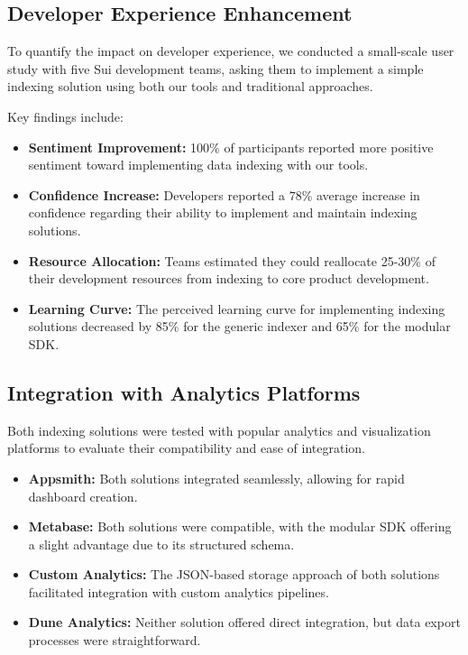 \subsection{Developer Experience Enhancement}

To quantify the impact on developer experience, we conducted a small-scale user study with five Sui development teams, asking them to implement a simple indexing solution using both our tools and traditional approaches.

Key findings include:

\begin{itemize}
    \item \textbf{Sentiment Improvement:} 100\% of participants reported more positive sentiment toward implementing data indexing with our tools.
    
    \item \textbf{Confidence Increase:} Developers reported a 78\% average increase in confidence regarding their ability to implement and maintain indexing solutions.
    
    \item \textbf{Resource Allocation:} Teams estimated they could reallocate 25-30\% of their development resources from indexing to core product development.
    
    \item \textbf{Learning Curve:} The perceived learning curve for implementing indexing solutions decreased by 85\% for the generic indexer and 65\% for the modular SDK.
\end{itemize}

\subsection{Integration with Analytics Platforms}

Both indexing solutions were tested with popular analytics and visualization platforms to evaluate their compatibility and ease of integration.

\begin{itemize}
    \item \textbf{Appsmith:} Both solutions integrated seamlessly, allowing for rapid dashboard creation.
    
    \item \textbf{Metabase:} Both solutions were compatible, with the modular SDK offering a slight advantage due to its structured schema.
    
    \item \textbf{Custom Analytics:} The JSON-based storage approach of both solutions facilitated integration with custom analytics pipelines.
    
    \item \textbf{Dune Analytics:} Neither solution offered direct integration, but data export processes were straightforward.
\end{itemize}

